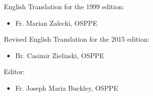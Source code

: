English Translation for the 1999 edition:
\begin{itemize}
\item Fr. Marian Zalecki, OSPPE
\end{itemize}
\medbreak

Revised English Translation for the 2015 edition:
\begin{itemize}
\item Br. Casimir Zielinski, OSPPE
\end{itemize}
\medbreak

Editor:
\begin{itemize}
\item Fr. Joseph Maria Buckley, OSPPE
\end{itemize}

\vfill

\pagebreak
